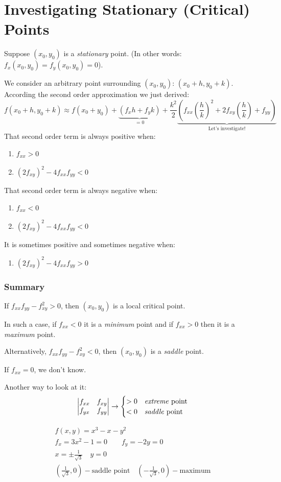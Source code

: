 \documentclass[00_complete]{subfiles}
\begin{document}
\section{Investigating Stationary (Critical) Points}
Suppose $(x_0,y_0)$ is a \emph{stationary} point. (In other words:
$f_x(x_0,y_0)=f_y(x_0,y_0)=0$).

We consider an arbitrary point surrounding $(x_0,y_0)$: $(x_0+h,y_0+k)$.
According the second order approximation we just derived:
$$f(x_0+h,y_0+k)\approx f(x_0+y_0)+
\underbrace{(f_xh+f_yk)}_{=0}
+\frac{k^2}{2}\underbrace{\left(f_{xx}\left(\frac{h}{k}\right)^2
    +2f_{xy}\left(\frac{h}{k}\right)
    +f_{yy}\right)}_{\text{Let's investigate!}}
$$
That second order term is always positive when:
\begin{enumerate} \tightlist
    \item $f_{xx} > 0$
    \item $(2f_{xy})^2-4f_{xx}f_{yy}<0$
\end{enumerate}
That second order term is always negative when:
\begin{enumerate} \tightlist
    \item $f_{xx} < 0$
    \item $(2f_{xy})^2-4f_{xx}f_{yy}<0$
\end{enumerate}
It is sometimes positive and sometimes negative when:
\begin{enumerate} \tightlist
    \item $(2f_{xy})^2-4f_{xx}f_{yy}>0$
\end{enumerate}
\subsubsection{Summary}
If $f_{xx}f_{yy}-f_{xy}^2>0$, then $(x_0,y_0)$ is a local critical point.

In such a case, if $f_{xx}<0$ it is a \emph{minimum} point and if $f_{xx}>0$
then it is a \emph{maximum} point.

Alternatively, $f_{xx}f_{yy}-f_{xy}^2<0$, then $(x_0,y_0)$ is a \emph{saddle}
point.
\begin{note}
    If $f_{xx}=0$, we don't know.
\end{note}
Another way to look at it:
$$\begin{vmatrix}
    f_{xx}&f_{xy}\\f_{yx}&f_{yy}
\end{vmatrix}\to \begin{cases}
    >0 & \text{\emph{extreme} point} \\
    <0 & \text{\emph{saddle} point}
\end{cases}$$
\begin{example}
\begin{gather*}
    f(x,y)=x^3-x-y^2\\
    f_x=3x^2-1=0 \qquad f_y=-2y=0 \\
    x=\pm\frac{1}{\sqrt 3} \quad y=0 \\
    \left(\frac{1}{\sqrt 3},0\right) - \text{saddle point} \quad
    \left(-\frac{1}{\sqrt 3},0\right) - \text{maximum}
\end{gather*}
\end{example}
\end{document}
